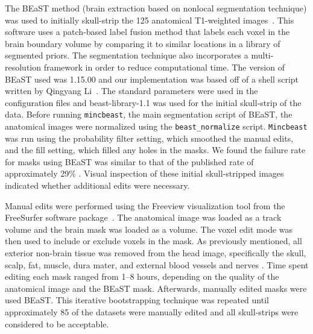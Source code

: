 \par The BEaST method (brain extraction based on nonlocal segmentation technique) was used to initially skull-strip the 125 anatomical T1-weighted images~\cite{Eskildsen2012}. This software uses a patch-based label fusion method that labels each voxel in the brain boundary volume by comparing it to similar locations in a library of segmented priors. The segmentation technique also incorporates a multi-resolution framework in order to reduce computational time. The version of BEaST used was 1.15.00 and our implementation was based off of a shell script written by Qingyang Li~\cite{rpubs}. The standard parameters were used in the configuration files and beast-library-1.1 \DIFaddbegin {}\DIFaddend was used for the initial skull-strip of the data. Before running {\tt mincbeast}, the main segmentation script of BEaST, the anatomical images were normalized using the {\tt beast\_normalize} script. {\tt Mincbeast} was run using the probability filter setting, which smoothed the manual edits, and the fill setting, which filled any holes in the masks. We found the failure rate for masks using BEaST was similar to that of the published rate of approximately 29\% \cite{Eskildsen2012}. Visual inspection of these initial skull-stripped images indicated whether additional edits were necessary.

\par Manual edits were performed using the Freeview visualization tool from the FreeSurfer software package~\cite{Fischl2012}. The anatomical image was loaded as a track volume and the brain mask was loaded as a volume. The voxel edit mode was then used to include or exclude voxels in the mask. As previously mentioned, all exterior non-brain tissue was removed from the head image, specifically the skull, scalp, fat, muscle, dura mater, and external blood vessels and nerves \DIFdelbegin \DIFdel{~\ref{fig:edit}}\DIFdelend {}\DIFaddend . Time spent editing each mask ranged from 1--8 hours, depending on the quality of the anatomical image and the BEaST mask. Afterwards, manually edited masks were used \DIFdelbegin {}\DIFdelend \DIFaddbegin {}\DIFaddend BEaST. This iterative bootstrapping technique was repeated until approximately 85 of the datasets were manually edited and all skull-strips were considered to be acceptable.

